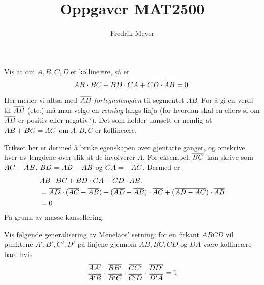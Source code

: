 \documentclass[11pt, norsk]{article}
\begin{document}
\title{Oppgaver MAT2500}
\author{Fredrik Meyer}
\maketitle 

\begin{oppg}
Vis at om $A,B,C,D$ er kollineære, så er 
\[
\overline{AB} \cdot \overline{BC}  + \overline{BD} \cdot \overline{CA} + \overline{CD} \cdot \overline{AB} = 0.
\]
\end{oppg}
\begin{losn}
 Her mener vi altså med $\overline{AB}$ \emph{fortegnslengden} til segmentet $AB$. For å gi en verdi til $\overline{AB}$ (etc.) må man velge en \emph{retning} langs linja (for hvordan skal en ellers si om $\overline{AB}$ er positiv eller negativ?). Det som holder uansett er nemlig at $\overline{AB} + \overline{BC} = \overline{AC}$ om $A,B,C$ er kollineære.

Trikset her er dermed å bruke egenskapen over gjentatte ganger, og omskrive hver av lengdene over slik at de involverer $A$. For eksempel: $\overline{BC}$ kan skrive som $\overline{AC}-\overline{AB}$. $\overline{BD} = \overline{AD}-\overline{AB}$ og $\overline{CA} = -\overline{AC}$. Dermed er
\begin{align*}
& \overline{AB} \cdot \overline{BC}  + \overline{BD} \cdot \overline{CA} + \overline{CD} \cdot \overline{AB}. \\
&= \overline{AD}\cdot (\overline{AC}-\overline{AB}) - (\overline{AD}-\overline{AB})\cdot \overline{AC} + (\overline{AD-AC}) \cdot \overline{AB} \\
&= 0
\end{align*}
På grunn av masse kansellering.
\end{losn}

\begin{oppg}
Vis følgende generalisering av Menelaos' setning: for en firkant $ABCD$ vil punktene $A',B',C',D'$ på linjene gjennom $AB, BC, CD$ og $DA$ være kollineære bare hvis 
$$
\frac{\overline{AA'}}{\overline{A'B}}\cdot \frac{\overline{BB'}}{\overline{B'C}} \cdot \frac{\overline{CC'}}{\overline{C'D}} \cdot \frac{\overline{DD'}}{\overline{D'A}} = 1
$$ 
\end{oppg}
\end{document}
